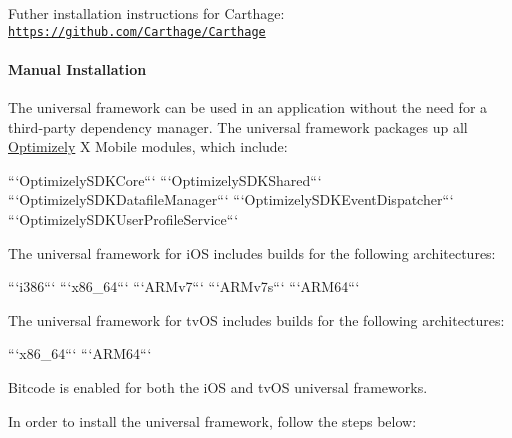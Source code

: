 Futher installation instructions for Carthage\+: \href{https://github.com/Carthage/Carthage}{\tt https\+://github.\+com/\+Carthage/\+Carthage}

\paragraph*{Manual Installation}

The universal framework can be used in an application without the need for a third-\/party dependency manager. The universal framework packages up all \mbox{\hyperlink{interface_optimizely}{Optimizely}} X Mobile modules, which include\+:
\begin{DoxyPre}
    ```OptimizelySDKCore```
    ```OptimizelySDKShared```
    ```OptimizelySDKDatafileManager```
    ```OptimizelySDKEventDispatcher```
    ```OptimizelySDKUserProfileService```\end{DoxyPre}


The universal framework for i\+OS includes builds for the following architectures\+:
\begin{DoxyPre}
    ```i386```
    ```x86\_64```
    ```ARMv7```
    ```ARMv7s```
    ```ARM64```\end{DoxyPre}


The universal framework for tv\+OS includes builds for the following architectures\+:
\begin{DoxyPre}
    ```x86\_64```
    ```ARM64```\end{DoxyPre}


Bitcode is enabled for both the i\+OS and tv\+OS universal frameworks.

In order to install the universal framework, follow the steps below\+:


